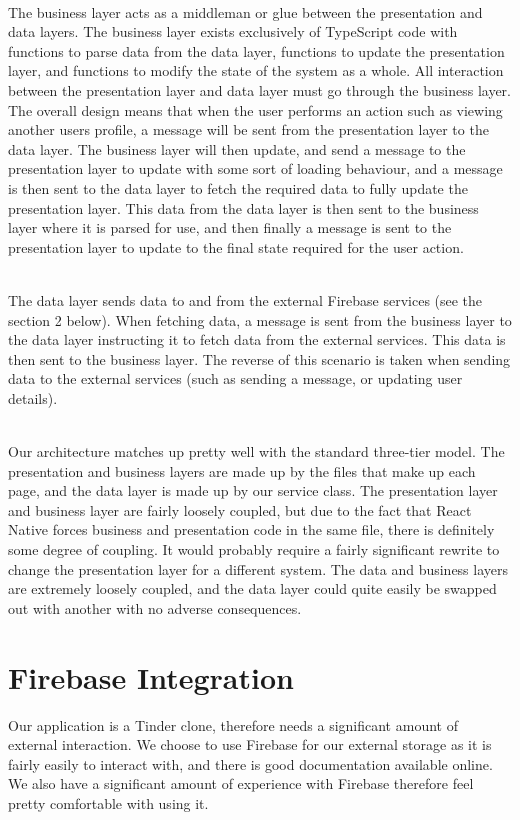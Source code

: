 \documentclass[a4paper, 11pt]{article}
\begin{document}
~\\
The business layer acts as a middleman or glue between the presentation and data layers. The business layer exists exclusively of TypeScript code with functions to parse data from the data layer, functions to update the presentation layer, and functions to modify the state of the system as a whole. All interaction between the presentation layer and data layer must go through the business layer. The overall design means that when the user performs an action such as viewing another users profile, a message will be sent from the presentation layer to the data layer. The business layer will then update, and send a message to the presentation layer to update with some sort of loading behaviour, and a message is then sent to the data layer to fetch the required data to fully update the presentation layer. This data from the data layer is then sent to the business layer where it is parsed for use, and then finally a message is sent to the presentation layer to update to the final state required for the user action.

~\\
The data layer sends data to and from the external Firebase services (see the section 2 below). When fetching data, a message is sent from the business layer to the data layer instructing it to fetch data from the external services. This data is then sent to the business layer. The reverse of this scenario is taken when sending data to the external services (such as sending a message, or updating user details).

~\\
Our architecture matches up pretty well with the standard three-tier model. The presentation and business layers are made up by the files that make up each page, and the data layer is made up by our service class. The presentation layer and business layer are fairly loosely coupled, but due to the fact that React Native forces business and presentation code in the same file, there is definitely some degree of coupling. It would probably require a fairly significant rewrite to change the presentation layer for a different system. The data and business layers are extremely loosely coupled, and the data layer could quite easily be swapped out with another with no adverse consequences.


\section{Firebase Integration}
Our application is a Tinder clone, therefore needs a significant amount of external interaction. We choose to use Firebase for our external storage as it is fairly easily to interact with, and there is good documentation available online. We also have a significant amount of experience with Firebase therefore feel pretty comfortable with using it.
\end{document}
